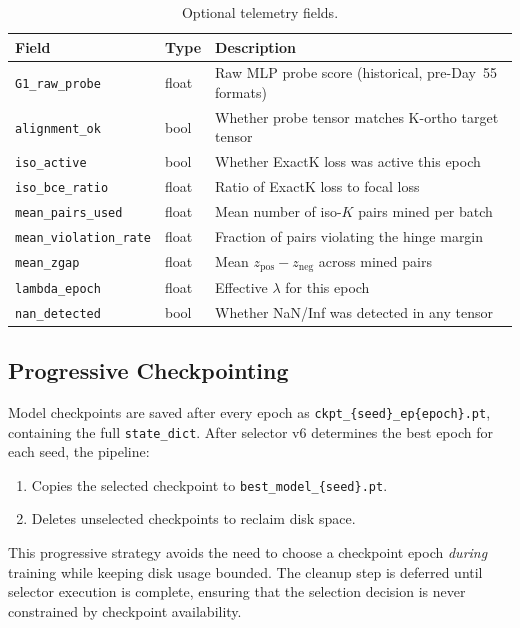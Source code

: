 \begin{table}
\caption{Optional telemetry fields.}
\begin{ruledtabular}
\begin{tabular}{lll}
Field & Type & Description \\
\hline
\texttt{G1\_raw\_probe} & float & Raw MLP probe score (historical, pre-Day~55 formats) \\
\texttt{alignment\_ok} & bool & Whether probe tensor matches K-ortho target tensor \\
\texttt{iso\_active} & bool & Whether ExactK loss was active this epoch \\
\texttt{iso\_bce\_ratio} & float & Ratio of ExactK loss to focal loss \\
\texttt{mean\_pairs\_used} & float & Mean number of iso-$K$ pairs mined per batch \\
\texttt{mean\_violation\_rate} & float & Fraction of pairs violating the hinge margin \\
\texttt{mean\_zgap} & float & Mean $z_{\text{pos}} - z_{\text{neg}}$ across mined pairs \\
\texttt{lambda\_epoch} & float & Effective $\lambda$ for this epoch \\
\texttt{nan\_detected} & bool & Whether NaN/Inf was detected in any tensor \\
\end{tabular}
\end{ruledtabular}
\end{table}

\subsection{Progressive Checkpointing}

Model checkpoints are saved after every epoch as \texttt{ckpt\_\{seed\}\_ep\{epoch\}.pt}, containing the full \texttt{state\_dict}. After selector v6 determines the best epoch for each seed, the pipeline:

\begin{enumerate}
\item Copies the selected checkpoint to \texttt{best\_model\_\{seed\}.pt}.
\item Deletes unselected checkpoints to reclaim disk space.
\end{enumerate}

This progressive strategy avoids the need to choose a checkpoint epoch \emph{during} training while keeping disk usage bounded. The cleanup step is deferred until selector execution is complete, ensuring that the selection decision is never constrained by checkpoint availability.

